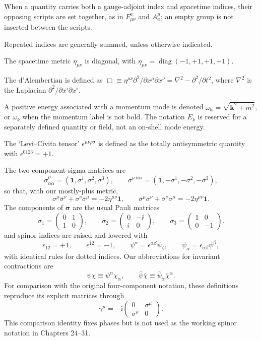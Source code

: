 When a quantity carries both a gauge-adjoint index and spacetime indices,
their opposing scripts are set together, as in
\(F^a_{\mu\nu}\) and \(A_a^\mu\);
an empty group is not inserted between the scripts.

Repeated indices are generally summed, unless otherwise indicated.

The spacetime metric \(\eta_{\mu\nu}\) is diagonal, with
\(\eta_{\mu\nu}=\operatorname{diag}(-1,+1,+1,+1)\).

The d'Alembertian is defined as
\(\Box\equiv\eta^{\mu\nu}\partial^2/\partial x^\mu\partial x^\nu
=\nabla^2-\partial^2/\partial t^2\), where \(\nabla^2\) is the Laplacian
\(\partial^2/\partial x^i\partial x^i\).

A positive energy associated with a momentum mode is denoted
\(\omega_{\mathbf{k}}=\sqrt{\mathbf{k}^2+m^2}\), or \(\omega_k\) when the
momentum label is not bold. The notation \(E_k\) is reserved for a separately
defined quantity or field, not an on-shell mode energy.

The `Levi--Civita tensor' \(\epsilon^{\mu\nu\rho\sigma}\) is defined as the
totally antisymmetric quantity with \(\epsilon^{0123}=+1\).

The two-component sigma matrices are
\[
  \sigma^\mu_{\alpha\dot\alpha}
  =(\mathbf{1},\sigma^1,\sigma^2,\sigma^3),
  \qquad
  \bar\sigma^{\mu\,\dot\alpha\alpha}
  =(\mathbf{1},-\sigma^1,-\sigma^2,-\sigma^3),
\]
so that, with our mostly-plus metric,
\[
  \sigma^\mu\bar\sigma^\nu+\sigma^\nu\bar\sigma^\mu
  =-2\eta^{\mu\nu}\mathbf{1},
  \qquad
  \bar\sigma^\mu\sigma^\nu+\bar\sigma^\nu\sigma^\mu
  =-2\eta^{\mu\nu}\mathbf{1}.
\]
The components of \(\boldsymbol\sigma\) are the usual Pauli matrices
\[
  \sigma_1=
  \begin{pmatrix}
    0 & 1\\
    1 & 0
  \end{pmatrix},
  \qquad
  \sigma_2=
  \begin{pmatrix}
    0 & -\ii\\
    i & 0
  \end{pmatrix},
  \qquad
  \sigma_3=
  \begin{pmatrix}
    1 & 0\\
    0 & -1
  \end{pmatrix}.
\]
and spinor indices are raised and lowered with
\[
  \epsilon_{12}=+1,\qquad
  \epsilon^{12}=-1,\qquad
  \psi^\alpha=\epsilon^{\alpha\beta}\psi_\beta,\qquad
  \psi_\alpha=\epsilon_{\alpha\beta}\psi^\beta,
\]
with identical rules for dotted indices.  Our abbreviations for invariant
contractions are
\[
  \psi\chi\equiv\psi^\alpha\chi_\alpha,\qquad
  \bar\psi\bar\chi
  \equiv\bar\psi_{\dot\alpha}\bar\chi^{\dot\alpha}.
\]
For comparison with the original four-component notation, these definitions
reproduce its explicit matrices through
\[
  \gamma^\mu=-\ii
  \begin{pmatrix}
    0&\sigma^\mu\\
    \bar\sigma^\mu&0
  \end{pmatrix}.
\]
This comparison identity fixes phases but is not used as the working spinor
notation in Chapters 24--31.

